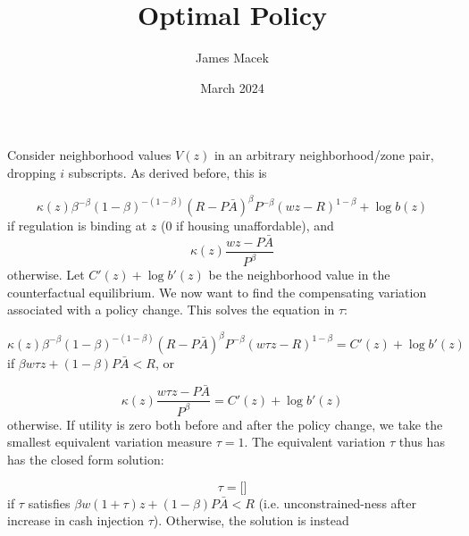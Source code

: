 \documentclass[11pt]{article}
\title{Optimal Policy}
\author{James Macek}
\date{March 2024}
\begin{document}
	
	\paragraph*{}
	Consider neighborhood values $V(z)$ in an arbitrary neighborhood/zone pair, dropping $i$ subscripts. As derived before, this is 
	
	\begin{equation*}
		\kappa(z)\beta^{-\beta}(1-\beta)^{-(1-\beta)}(R - P\bar{A})^{\beta}P^{-\beta}(wz - R)^{1 - \beta} + \log b(z)
	\end{equation*}
	if regulation is binding at $z$ (0 if housing unaffordable), and 
	\begin{equation*}
		\kappa(z)\frac{wz - P\bar{A}}{P^{\beta}}
	\end{equation*}
	otherwise. Let $C'(z) + \log b'(z)$ be the neighborhood value in the counterfactual equilibrium. We now want to find the compensating variation associated with a policy change. This solves the equation in $\tau$:
	
	\begin{equation*}
			\kappa(z)\beta^{-\beta}(1-\beta)^{-(1-\beta)}(R - P\bar{A})^{\beta}P^{-\beta}(w\tau z - R)^{1 - \beta} = C'(z) + \log b'(z)
	\end{equation*}
	if $\beta w \tau z + (1-\beta)P\bar{A} < R$, or 
	
	\begin{equation*}
			\kappa(z)\frac{w\tau z - P\bar{A}}{P^{\beta}} = C'(z) + \log b'(z)
	\end{equation*}
	otherwise. If utility is zero both before and after the policy change, we take the smallest equivalent variation measure $\tau = 1$. The equivalent variation $\tau$ thus has has the closed form solution:
	
	\begin{equation}
		\tau = \bigg[ \bigg]
	\end{equation} 
	if $\tau$ satisfies $\beta w (1 + \tau) z + (1-\beta)P\bar{A} < R$ (i.e. unconstrained-ness after increase in cash injection $\tau$). Otherwise, the solution is instead 
	
	
\end{document}
